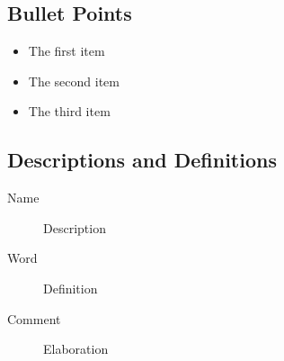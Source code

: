 \documentclass[11pt,fleqn]{book} %
\begin{document}
\subsection{Bullet Points}

\begin{itemize}
\item The first item
\item The second item
\item The third item
\end{itemize}

\subsection{Descriptions and Definitions}

\begin{description}
\item[Name] Description
\item[Word] Definition
\item[Comment] Elaboration
\end{description}


%
%
%
%
%
%
\end{document}

